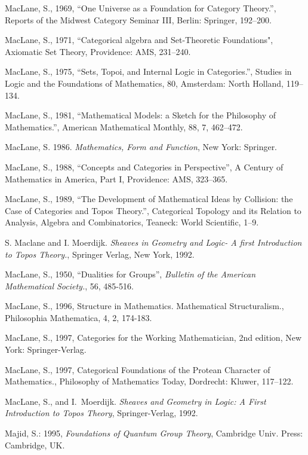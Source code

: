 \documentclass[12pt]{article}
\begin{document}
\begin{thebibliography}{399}
MacLane, S., 1969, ``One Universe as a Foundation for Category Theory.'', Reports of the Midwest Category Seminar III, Berlin: Springer, 192--200. 

MacLane, S., 1971, ``Categorical algebra and Set-Theoretic Foundations", Axiomatic Set Theory, Providence: AMS, 231--240. 

MacLane, S., 1975, ``Sets, Topoi, and Internal Logic in Categories.'', Studies in Logic and the Foundations of Mathematics, 80, Amsterdam: North Holland, 119--134. 

MacLane, S., 1981, ``Mathematical Models: a Sketch for the Philosophy of Mathematics.'', American Mathematical Monthly, 88, 7, 462--472.
 
MacLane, S. 1986. {\em Mathematics, Form and Function}, New York: Springer. 

MacLane, S., 1988, ``Concepts and Categories in Perspective'', A Century of Mathematics in America, Part I, Providence: AMS, 323--365. 

MacLane, S., 1989, ``The Development of Mathematical Ideas by Collision: the Case of Categories and Topos Theory.'', Categorical Topology and its Relation to Analysis, Algebra and Combinatorics, Teaneck: World Scientific, 1--9.

S. Maclane and I. Moerdijk. {\em Sheaves in Geometry and Logic- A first Introduction to Topos Theory.}, Springer Verlag, New York, 1992. 

MacLane, S., 1950, ``Dualities for Groups'', {\em Bulletin of the American Mathematical Society.}, 56, 485-516. 

MacLane, S., 1996, Structure in Mathematics. Mathematical Structuralism., Philosophia Mathematica, 4, 2, 174-183. 

MacLane, S., 1997, Categories for the Working Mathematician, 2nd edition, New York: Springer-Verlag. 

MacLane, S., 1997, Categorical Foundations of the Protean Character of Mathematics., Philosophy of Mathematics Today, Dordrecht: Kluwer, 117--122. 

MacLane, S., and I.~Moerdijk. {\em Sheaves and Geometry in Logic: A First Introduction to Topos Theory}, Springer-Verlag, 1992.

Majid, S.: 1995, \emph{Foundations of Quantum Group Theory},
Cambridge Univ. Press: Cambridge, UK.


\end{thebibliography}
\end{document}
